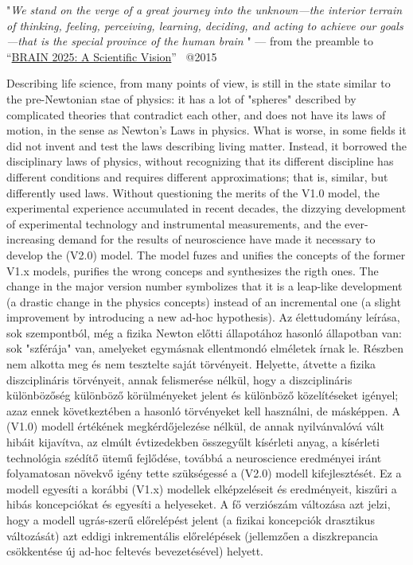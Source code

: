 \quotationbox
{
"\textit{We stand on the verge of a great journey into the unknown—the interior terrain of thinking, feeling, perceiving, learning, deciding, and acting to achieve our goals—that is the special province of the human brain
}"
 — from the preamble to “\href{https://www.sciencedirect.com/science/article/pii/S089662732400655X}{BRAIN 2025: A Scientific Vision}”~\cite{BrainInitiative10:2024} @2015
}

\ifx\magyar\undefined
Describing life science, from many points of view, is still in the state similar to the pre-Newtonian stae of physics: it has a lot of "spheres"
described by complicated theories that contradict each other,
and does not have its laws of motion, in the sense as Newton's Laws in physics. What is worse, in some fields it did not invent and test the laws describing
living matter. Instead, it borrowed the disciplinary laws of physics,
without recognizing that its different discipline has different
conditions and requires different approximations; that is, similar, but differently used laws. 
Without questioning the merits of the V1.0 model, the experimental experience accumulated in recent decades, the dizzying development of experimental technology and instrumental measurements, and the ever-increasing demand for the results of neuroscience have made it necessary to develop the (V2.0) model. The model fuzes and unifies the concepts
of the former V1.x models, purifies the wrong conceps
and synthesizes the rigth ones.
The change in the major version number
symbolizes that it is a leap-like development (a drastic change in the physics concepts) instead of an
incremental one (a slight improvement by introducing a new ad-hoc hypothesis).
\else
Az élettudomány leírása, sok szempontból, még a fizika Newton előtti állapotához hasonló állapotban van: sok "szférája" van, amelyeket egymásnak ellentmondó elméletek írnak le. Részben nem alkotta meg és 
nem tesztelte saját törvényeit.
Helyette, átvette a fizika diszciplináris törvényeit, 
annak fel\-ismerése nélkül, hogy a diszciplináris különbözőség
különböző körülményeket jelent és különböző közelítéseket igényel; azaz ennek következtében a hasonló törvényeket kell használni, de másképpen.
A (V1.0) modell értékének megkérdőjelezése nélkül, 
de annak nyilvánvalóvá vált hibáit kijavítva,
az elmúlt évtizedekben összegyűlt kísérleti anyag,
a kísérleti technológia szédítő ütemű fejlődése,
továbbá a neuroscience eredményei iránt folyamatosan  
növekvő igény tette szükségessé a (V2.0) modell kifejlesztését.
Ez a modell egyesíti a korábbi (V1.x) modellek 
elképzeléseit és eredményeit, kiszűri a hibás 
koncepciókat és egyesíti a helyeseket.
A fő verziószám változása azt jelzi, hogy
a modell ugrás-szerű előrelépést jelent (a fizikai koncepciók
drasztikus változását) azt eddigi  inkrementális
előrelépések (jellemzően a diszkrepancia csökkentése új ad-hoc feltevés bevezetésével) helyett.
\fi


